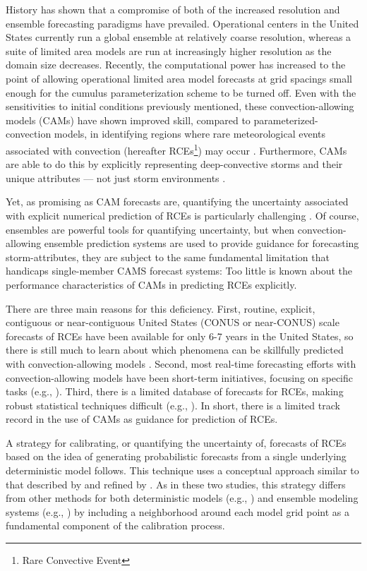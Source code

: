 History has shown that a compromise of both of the increased resolution and ensemble forecasting paradigms have prevailed.
Operational centers in the United States currently run a global ensemble at relatively coarse resolution, whereas a suite of limited area models are run at increasingly higher resolution as the domain size decreases.
Recently, the computational power has increased to the point of allowing operational limited area model forecasts at grid spacings small enough for the cumulus parameterization scheme to be turned off.
Even with the sensitivities to initial conditions previously mentioned, these convection-allowing models (CAMs) have shown improved skill, compared to parameterized-convection models, in identifying regions where rare meteorological events associated with convection (hereafter RCEs\footnote{Rare Convective Event}) may occur \citep{Clark2010a}.
Furthermore, CAMs are able to do this by explicitly representing deep-convective storms and their unique attributes --- not just storm environments \citep{Kain2010}.


Yet, as promising as CAM forecasts are, quantifying the uncertainty associated with explicit numerical prediction of RCEs is particularly challenging \citep{Sobash2011}.
Of course, ensembles are powerful tools for quantifying uncertainty, but when convection-allowing ensemble prediction systems are used to provide guidance for forecasting storm-attributes, they are subject to the same fundamental limitation that handicaps single-member CAMS forecast systems: Too little is known about the performance characteristics of CAMs in predicting RCEs explicitly.


There are three main reasons for this deficiency.
First, routine, explicit, contiguous  or near-contiguous United States (CONUS or near-CONUS) scale forecasts of RCEs have been available for only 6-7 years in the United States, so there is still much to learn about which phenomena can be skillfully predicted with convection-allowing models \citep{Kain2008, Kain2010}.
Second, most real-time forecasting efforts with convection-allowing models have been short-term initiatives, focusing on specific tasks (e.g., \citealp{Done2004, Weisman2008}).
Third, there is a limited database of forecasts for RCEs, making robust statistical techniques difficult (e.g., \citealp{Hamill2006}).
In short, there is a limited track record in the use of CAMs as guidance for prediction of RCEs.


A strategy for calibrating, or quantifying the uncertainty of, forecasts of RCEs based on the idea of generating probabilistic forecasts from a single underlying deterministic model follows.
This technique uses a conceptual approach similar to that described by \cite{Theis2005} and refined by \cite{Sobash2011}.
As in these two studies, this strategy differs from other methods for both deterministic models (e.g., \citealp{Glahn1972}) and ensemble modeling systems (e.g., \citealp{Hamill1998, Raftery2005, Clark2009, Glahn2009}) by including a neighborhood around each model grid point as a fundamental component of the calibration process.



